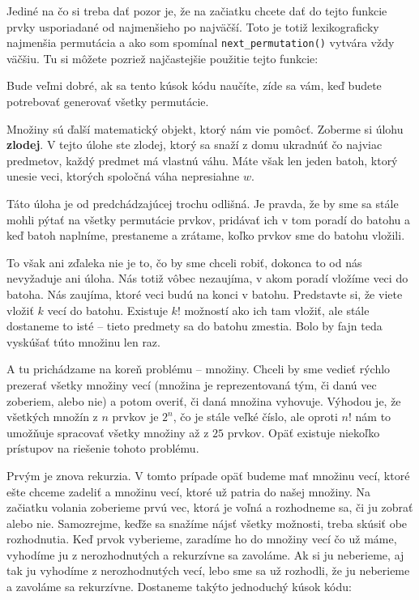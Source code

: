 Jediné na čo si treba dať pozor je, že na začiatku chcete dať do tejto funkcie prvky usporiadané od
najmenšieho po najväčší. Toto je totiž lexikograficky najmenšia permutácia a ako som spomínal
\texttt{next\_permutation()} vytvára vždy väčšiu. Tu si môžete pozriež najčastejšie použitie tejto
funkcie:


Bude veľmi dobré, ak sa tento kúsok kódu naučíte, zíde sa vám, keď budete potrebovať generovať všetky
permutácie.


Množiny sú ďalší matematický objekt, ktorý nám vie pomôcť. Zoberme si úlohu \textbf{zlodej}. V tejto
úlohe ste zlodej, ktorý sa snaží z domu ukradnúť čo najviac predmetov, každý predmet má vlastnú váhu.
Máte však len jeden batoh, ktorý unesie veci, ktorých spoločná váha nepresiahne $w$.

Táto úloha je od predchádzajúcej trochu odlišná. Je pravda, že by sme sa stále mohli pýtať na všetky
permutácie prvkov, pridávať ich v tom poradí do batohu a keď batoh naplníme, prestaneme a zrátame,
koľko prvkov sme do batohu vložili.

To však ani zďaleka nie je to, čo by sme chceli robiť, dokonca to od nás nevyžaduje ani úloha. Nás
totiž vôbec nezaujíma, v akom poradí vložíme veci do batoha. Nás zaujíma, ktoré veci budú na konci v
batohu. Predstavte si, že viete vložiť $k$ vecí do batohu. Existuje $k!$ možností ako ich tam
vložiť, ale stále dostaneme to isté -- tieto predmety sa do batohu zmestia. Bolo by fajn teda
vyskúšať túto množinu len raz.

A tu prichádzame na koreň problému -- množiny. Chceli by sme vedieť rýchlo prezerať všetky množiny
vecí (množina je reprezentovaná tým, či danú vec zoberiem, alebo nie) a potom overiť, či daná
množina vyhovuje. Výhodou je, že všetkých množín z $n$ prvkov je $2^n$, čo je stále veľké číslo, ale
oproti $n!$ nám to umožňuje spracovať všetky množiny až z $25$ prvkov.
Opäť existuje niekoľko prístupov na riešenie tohoto problému.

Prvým je znova rekurzia. V tomto prípade opäť budeme mať množinu vecí, ktoré ešte chceme zadeliť a
množinu vecí, ktoré už patria do našej množiny. Na začiatku volania zoberieme prvú vec, ktorá je
voľná a rozhodneme sa, či ju zobrať alebo nie. Samozrejme, keďže sa snažíme nájsť všetky možnosti,
treba skúsiť obe rozhodnutia. Keď prvok vyberieme, zaradíme ho do množiny vecí čo už máme, vyhodíme
ju z nerozhodnutých a rekurzívne sa zavoláme. Ak si ju neberieme, aj tak ju vyhodíme z
nerozhodnutých vecí, lebo sme sa už rozhodli, že ju neberieme a zavoláme sa rekurzívne. Dostaneme
takýto jednoduchý kúsok kódu:

